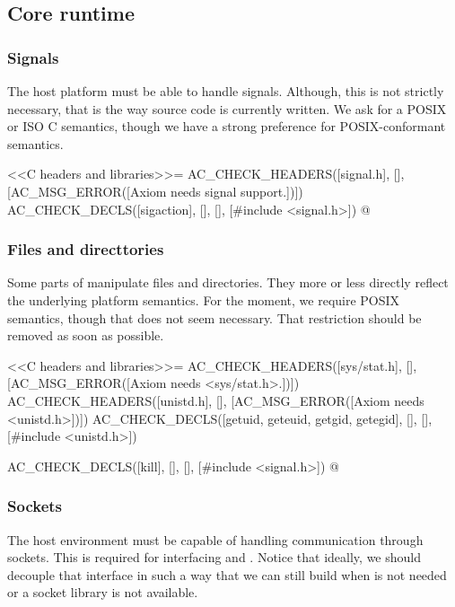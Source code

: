 \documentclass[12pt]{article}
\begin{document}
\subsection{Core runtime}

\subsubsection{Signals}

The host platform must be able to handle signals.  Although, this is
not strictly necessary, that is the way  source code
is currently written.  We ask for a POSIX or ISO C semantics, though
we have a strong preference for POSIX-conformant semantics.

<<C headers and libraries>>=
AC_CHECK_HEADERS([signal.h],
                 [],
                 [AC_MSG_ERROR([Axiom needs signal support.])])
AC_CHECK_DECLS([sigaction], [], [],
               [#include <signal.h>])
@


\subsubsection{Files and directtories}

Some parts of  manipulate files and directories.  They
more or less directly reflect the underlying platform semantics.
For the moment, we require POSIX semantics, though that does not
seem necessary.  That restriction should be removed as soon as possible.

<<C headers and libraries>>=
AC_CHECK_HEADERS([sys/stat.h],
                 [],
		 [AC_MSG_ERROR([Axiom needs <sys/stat.h>.])])
AC_CHECK_HEADERS([unistd.h], [],
                 [AC_MSG_ERROR([Axiom needs <unistd.h>])])
AC_CHECK_DECLS([getuid, geteuid, getgid, getegid], [], [],
               [#include <unistd.h>])

AC_CHECK_DECLS([kill], [], [],
               [#include <signal.h>])
@

\subsubsection{Sockets}

The host environment must be capable of handling communication through
sockets.  This is required for interfacing 
and .  Notice that ideally, we should decouple
that interface in such a way that we can still build 
when  is not needed or a socket library is not
available.
\end{document}
